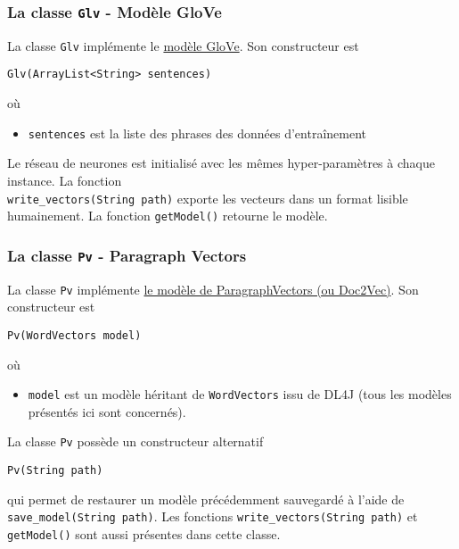 \documentclass[10pt,a4paper]{article}
\newcommand\tab[1][0.5cm]{\hspace*{#1}}
\begin{document}
\subsubsection{La classe \texttt{Glv} - Modèle GloVe}
La classe \texttt{Glv} implémente le \href{https://en.wikipedia.org/wiki/GloVe_(machine_learning)}{modèle GloVe}. Son constructeur est
\begin{center}
\texttt{Glv(ArrayList<String> sentences)}
\end{center}
où
\begin{itemize}
\item \texttt{sentences} est la liste des phrases des données d'entraînement
\end{itemize}
\tab Le réseau de neurones est initialisé avec les mêmes hyper-paramètres à chaque instance. La fonction \\
\noindent \texttt{write\_vectors(String path)} exporte les vecteurs dans un format lisible humainement. La fonction \texttt{getModel()} retourne le modèle.
\subsubsection{La classe \texttt{Pv} - Paragraph Vectors}
La classe \texttt{Pv} implémente \href{https://cs.stanford.edu/~quocle/paragraph_vector.pdf}{le modèle de ParagraphVectors (ou Doc2Vec)}. Son constructeur est 
\begin{center}
\texttt{Pv(WordVectors model)}
\end{center}
où
\begin{itemize}
\item \texttt{model} est un modèle héritant de \texttt{WordVectors} issu de DL4J (tous les modèles présentés ici sont concernés).
\end{itemize}
\tab La classe \texttt{Pv} possède un constructeur alternatif
\begin{center}
\texttt{Pv(String path)}
\end{center}
qui permet de restaurer un modèle précédemment sauvegardé à l'aide de \texttt{save\_model(String path)}. Les fonctions \texttt{write\_vectors(String path)} et \texttt{getModel()} sont aussi présentes dans cette classe.
\end{document}
